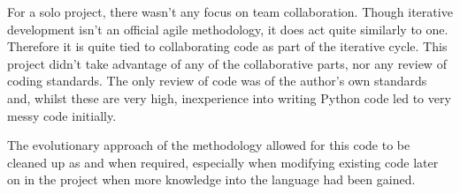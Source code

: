 For a solo project, there wasn't any focus on team collaboration. Though iterative development 
isn't an official agile methodology, it does act quite similarly to one. Therefore it is quite 
tied to collaborating code as part of the iterative cycle. This project didn't take advantage of
any of the collaborative parts, nor any review of coding standards. The only review of code was
of the author's own standards and, whilst these are very high, inexperience into writing Python 
code led to very messy code initially.

The evolutionary approach of the methodology allowed for this code to be cleaned up as and when
required, especially when modifying existing code later on in the project when more knowledge into
the language had been gained.

